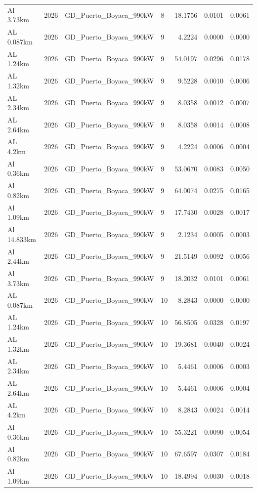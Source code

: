\documentclass[11pt,a4paper]{article}
\begin{document}
\begin{longtable}{llllrrr}
Al 3.73km & 2026 & GD\_Puerto\_Boyaca\_990kW & 8 & 18.1756 & 0.0101 & 0.0061 \\
AL 0.087km & 2026 & GD\_Puerto\_Boyaca\_990kW & 9 & 4.2224 & 0.0000 & 0.0000 \\
AL 1.24km & 2026 & GD\_Puerto\_Boyaca\_990kW & 9 & 54.0197 & 0.0296 & 0.0178 \\
AL 1.32km & 2026 & GD\_Puerto\_Boyaca\_990kW & 9 & 9.5228 & 0.0010 & 0.0006 \\
AL 2.34km & 2026 & GD\_Puerto\_Boyaca\_990kW & 9 & 8.0358 & 0.0012 & 0.0007 \\
AL 2.64km & 2026 & GD\_Puerto\_Boyaca\_990kW & 9 & 8.0358 & 0.0014 & 0.0008 \\
AL 4.2km & 2026 & GD\_Puerto\_Boyaca\_990kW & 9 & 4.2224 & 0.0006 & 0.0004 \\
Al 0.36km & 2026 & GD\_Puerto\_Boyaca\_990kW & 9 & 53.0670 & 0.0083 & 0.0050 \\
Al 0.82km & 2026 & GD\_Puerto\_Boyaca\_990kW & 9 & 64.0074 & 0.0275 & 0.0165 \\
Al 1.09km & 2026 & GD\_Puerto\_Boyaca\_990kW & 9 & 17.7430 & 0.0028 & 0.0017 \\
Al 14.833km & 2026 & GD\_Puerto\_Boyaca\_990kW & 9 & 2.1234 & 0.0005 & 0.0003 \\
Al 2.44km & 2026 & GD\_Puerto\_Boyaca\_990kW & 9 & 21.5149 & 0.0092 & 0.0056 \\
Al 3.73km & 2026 & GD\_Puerto\_Boyaca\_990kW & 9 & 18.2032 & 0.0101 & 0.0061 \\
AL 0.087km & 2026 & GD\_Puerto\_Boyaca\_990kW & 10 & 8.2843 & 0.0000 & 0.0000 \\
AL 1.24km & 2026 & GD\_Puerto\_Boyaca\_990kW & 10 & 56.8505 & 0.0328 & 0.0197 \\
AL 1.32km & 2026 & GD\_Puerto\_Boyaca\_990kW & 10 & 19.3681 & 0.0040 & 0.0024 \\
AL 2.34km & 2026 & GD\_Puerto\_Boyaca\_990kW & 10 & 5.4461 & 0.0006 & 0.0003 \\
AL 2.64km & 2026 & GD\_Puerto\_Boyaca\_990kW & 10 & 5.4461 & 0.0006 & 0.0004 \\
AL 4.2km & 2026 & GD\_Puerto\_Boyaca\_990kW & 10 & 8.2843 & 0.0024 & 0.0014 \\
Al 0.36km & 2026 & GD\_Puerto\_Boyaca\_990kW & 10 & 55.3221 & 0.0090 & 0.0054 \\
Al 0.82km & 2026 & GD\_Puerto\_Boyaca\_990kW & 10 & 67.6597 & 0.0307 & 0.0184 \\
Al 1.09km & 2026 & GD\_Puerto\_Boyaca\_990kW & 10 & 18.4994 & 0.0030 & 0.0018 \\

\end{longtable}
\end{document}

